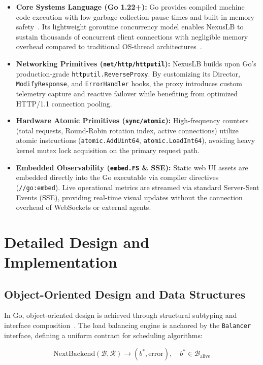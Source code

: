 \documentclass[12pt,openany]{report}
\begin{document}
\begin{itemize}
  \item \textbf{Core Systems Language (Go 1.22+):} Go provides compiled machine code execution with low garbage collection pause times and built-in memory safety~\cite{donovan2015}. Its lightweight goroutine concurrency model enables NexusLB to sustain thousands of concurrent client connections with negligible memory overhead compared to traditional OS-thread architectures~\cite{pike2012}.
  \item \textbf{Networking Primitives (\texttt{net/http/httputil}):} NexusLB builds upon Go's production-grade \texttt{httputil.ReverseProxy}. By customizing its Director, \texttt{ModifyResponse}, and \texttt{ErrorHandler} hooks, the proxy introduces custom telemetry capture and reactive failover while benefiting from optimized HTTP/1.1 connection pooling.
  \item \textbf{Hardware Atomic Primitives (\texttt{sync/atomic}):} High-frequency counters (total requests, Round-Robin rotation index, active connections) utilize atomic instructions (\texttt{atomic.AddUint64}, \texttt{atomic.LoadInt64}), avoiding heavy kernel mutex lock acquisition on the primary request path.
  \item \textbf{Embedded Observability (\texttt{embed.FS} \& SSE):} Static web UI assets are embedded directly into the Go executable via compiler directives (\texttt{//go:embed}). Live operational metrics are streamed via standard Server-Sent Events (SSE), providing real-time visual updates without the connection overhead of WebSockets or external agents.
\end{itemize}

\clearpage
\section{Detailed Design and Implementation}

\subsection{Object-Oriented Design and Data Structures}

In Go, object-oriented design is achieved through structural subtyping and interface composition~\cite{gamma1994, donovan2015}. The load balancing engine is anchored by the \texttt{Balancer} interface, defining a uniform contract for scheduling algorithms:

\begin{equation}
  \text{NextBackend}(\mathcal{B}, \mathcal{R}) \to (b^*, \text{error}), \quad b^* \in \mathcal{B}_{\text{alive}}
\end{equation}
\end{document}
